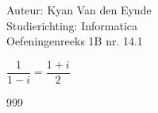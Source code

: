 \documentclass[a4paper]{article}
\begin{document}
  
\noindent \large Auteur: Kyan Van den Eynde \\
\noindent \large Studierichting: Informatica\\
\noindent \large Oefeningenreeks 1B nr. 14.1\\

\medskip

\normalsize

$\dfrac{1}{1-i} = \dfrac{1+i}{2}$\\

\begin{thebibliography}{999}
\end{thebibliography}
\end{document}
